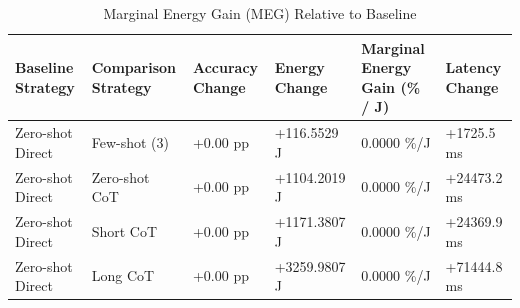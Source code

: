 \begin{table}
\caption{Marginal Energy Gain (MEG) Relative to Baseline}
\label{tab:marginal_energy_gain}
\begin{tabular}{llllll}
\toprule
Baseline Strategy & Comparison Strategy & Accuracy Change & Energy Change & Marginal Energy Gain (\% / J) & Latency Change \\
\midrule
Zero-shot Direct & Few-shot (3) & +0.00 pp & +116.5529 J & 0.0000 \%/J & +1725.5 ms \\
Zero-shot Direct & Zero-shot CoT & +0.00 pp & +1104.2019 J & 0.0000 \%/J & +24473.2 ms \\
Zero-shot Direct & Short CoT & +0.00 pp & +1171.3807 J & 0.0000 \%/J & +24369.9 ms \\
Zero-shot Direct & Long CoT & +0.00 pp & +3259.9807 J & 0.0000 \%/J & +71444.8 ms \\
\bottomrule
\end{tabular}
\end{table}
